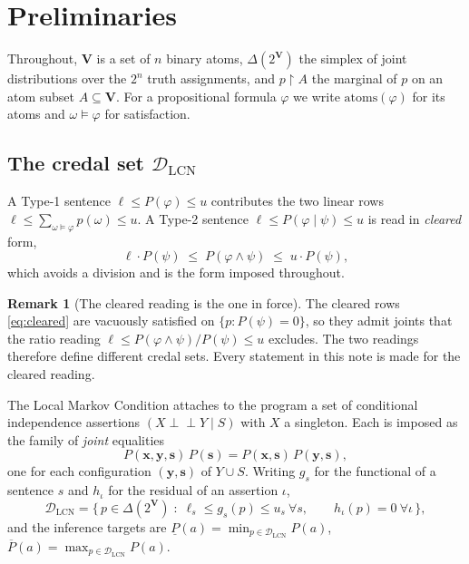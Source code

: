 \documentclass[11pt]{article}
\theoremstyle{definition}
\newtheorem{remark}{Remark}
\newcommand{\lo}{\underline}
\newcommand{\hi}{\overline}
\newcommand{\indep}{\perp\!\!\!\perp}
\newcommand{\DLCN}{\mathcal{D}_{\mathrm{LCN}}}
\newcommand{\atoms}{\mathrm{atoms}}
\newcommand{\restr}{\!\restriction\!}
\begin{document}
\section{Preliminaries}\label{sec:prelim}

Throughout, $\mathbf V$ is a set of $n$ binary atoms, $\Delta(2^{\mathbf V})$ the
simplex of joint distributions over the $2^n$ truth assignments, and
$p\restr A$ the marginal of $p$ on an atom subset $A\subseteq\mathbf V$. For a
propositional formula $\varphi$ we write $\atoms(\varphi)$ for its atoms and
$\omega\models\varphi$ for satisfaction.

\subsection{The credal set \texorpdfstring{$\DLCN$}{D\_LCN}}\label{sec:prelim-dlcn}

A Type-1 sentence $\ell\le P(\varphi)\le u$ contributes the two linear rows
$\ell\le\sum_{\omega\models\varphi}p(\omega)\le u$. A Type-2 sentence
$\ell\le P(\varphi\mid\psi)\le u$ is read in \emph{cleared} form,
\begin{equation}\label{eq:cleared}
  \ell\cdot P(\psi)\;\le\;P(\varphi\wedge\psi)\;\le\;u\cdot P(\psi),
\end{equation}
which avoids a division and is the form imposed throughout.

\begin{remark}[The cleared reading is the one in force]\label{rem:cleared}
The cleared rows \eqref{eq:cleared} are vacuously satisfied on
$\{p:P(\psi)=0\}$, so they admit joints that the ratio reading
$\ell\le P(\varphi\wedge\psi)/P(\psi)\le u$ excludes. The two readings therefore
define different credal sets. Every statement in this note is made for the
cleared reading.
\end{remark}

The Local Markov Condition attaches to the program a set of conditional
independence assertions $(X\indep Y\mid S)$ with $X$ a singleton. Each is imposed
as the family of \emph{joint} equalities
\begin{equation}\label{eq:lmc}
  P(\mathbf x,\mathbf y,\mathbf s)\,P(\mathbf s)
  =P(\mathbf x,\mathbf s)\,P(\mathbf y,\mathbf s),
\end{equation}
one for each configuration $(\mathbf y,\mathbf s)$ of $Y\cup S$. Writing $g_s$
for the functional of a sentence $s$ and $h_\iota$ for the residual of an
assertion $\iota$,
\begin{equation}\label{eq:dlcn}
  \DLCN=\bigl\{\,p\in\Delta(2^{\mathbf V})\;:\;
    \ell_s\le g_s(p)\le u_s\ \forall s,\qquad h_\iota(p)=0\ \forall \iota\,\bigr\},
\end{equation}
and the inference targets are
$\lo P(a)=\min_{p\in\DLCN}P(a)$, $\hi P(a)=\max_{p\in\DLCN}P(a)$.
\end{document}
